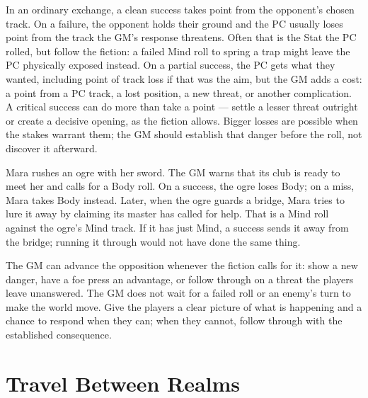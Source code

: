 In an ordinary exchange, a clean success takes  point from the
opponent's chosen track. On a failure, the opponent holds their ground
and the PC usually loses  point from the track the GM's
response threatens. Often that is the Stat the PC rolled, but follow
the fiction: a failed Mind roll to spring a trap might leave the PC
physically exposed instead. On a partial success, the PC gets what they
wanted, including  point of track loss if that was the aim, but
the GM adds a cost: a point from a PC track, a lost position, a new
threat, or another complication. A critical success can do more than
take a point --- settle a lesser threat outright or create a decisive
opening, as the fiction allows. Bigger losses are possible when the
stakes warrant them; the GM should establish that danger before the
roll, not discover it afterward.

\begin{example}
Mara rushes an ogre with her sword. The GM warns that its club is ready
to meet her and calls for a Body roll. On a success, the ogre loses
 Body; on a miss, Mara takes  Body instead. Later, when
the ogre guards a bridge, Mara tries to lure it away by claiming its
master has called for help. That is a Mind roll against the ogre's Mind
track. If it has just  Mind, a success sends it away from the
bridge; running it through would not have done the same thing.
\end{example}

The GM can advance the opposition whenever the fiction calls for it:
show a new danger, have a foe press an advantage, or follow through on
a threat the players leave unanswered. The GM does not wait for a failed
roll or an enemy's turn to make the world move. Give the players a clear
picture of what is happening and a chance to respond when they can;
when they cannot, follow through with the established consequence.

\section{Travel Between Realms}
\lipsum[27][1-4]

